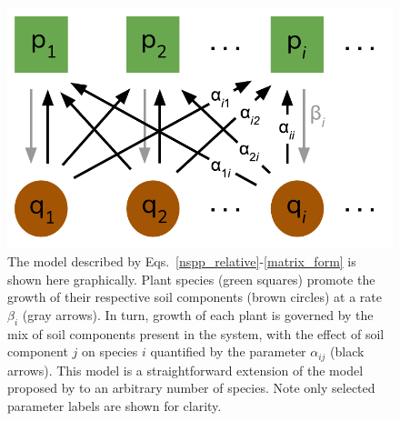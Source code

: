 \documentclass[11pt]{article}
\begin{document}



\begin{figure}
	\centering
	\includegraphics[width=\textwidth]{figure_1.pdf}
	\caption[Structure of the $n$-species Bever model]
	{The model described by Eqs.~\ref{nspp_relative}-\ref{matrix_form} is shown here graphically. Plant species (green squares) promote the growth of their respective soil components (brown circles) at a rate $\beta_i$ (gray arrows). In turn, growth of each plant is governed by the mix of soil components present in the system, with the effect of soil component $j$ on species $i$ quantified by the parameter $\alpha_{ij}$ (black arrows). This model is a straightforward extension of the model proposed by \citet{bever1997incorporating} to an arbitrary number of species. Note only selected parameter labels are shown for clarity.}
	\label{fig:concept}
\end{figure}
\end{document}
